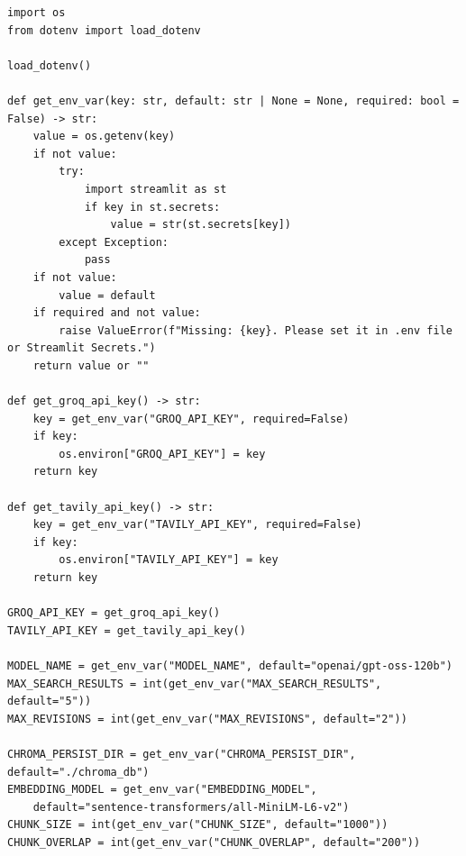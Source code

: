 \documentclass[11pt, a4paper]{article}
\begin{document}
\begin{lstlisting}[style=pythonstyle, caption={config/setting.py --- Poora Code}]
import os
from dotenv import load_dotenv

load_dotenv()

def get_env_var(key: str, default: str | None = None, required: bool = False) -> str:
    value = os.getenv(key)
    if not value:
        try:
            import streamlit as st
            if key in st.secrets:
                value = str(st.secrets[key])
        except Exception:
            pass
    if not value:
        value = default
    if required and not value:
        raise ValueError(f"Missing: {key}. Please set it in .env file or Streamlit Secrets.")
    return value or ""

def get_groq_api_key() -> str:
    key = get_env_var("GROQ_API_KEY", required=False)
    if key:
        os.environ["GROQ_API_KEY"] = key
    return key

def get_tavily_api_key() -> str:
    key = get_env_var("TAVILY_API_KEY", required=False)
    if key:
        os.environ["TAVILY_API_KEY"] = key
    return key

GROQ_API_KEY = get_groq_api_key()
TAVILY_API_KEY = get_tavily_api_key()

MODEL_NAME = get_env_var("MODEL_NAME", default="openai/gpt-oss-120b")
MAX_SEARCH_RESULTS = int(get_env_var("MAX_SEARCH_RESULTS", default="5"))
MAX_REVISIONS = int(get_env_var("MAX_REVISIONS", default="2"))

CHROMA_PERSIST_DIR = get_env_var("CHROMA_PERSIST_DIR", default="./chroma_db")
EMBEDDING_MODEL = get_env_var("EMBEDDING_MODEL",
    default="sentence-transformers/all-MiniLM-L6-v2")
CHUNK_SIZE = int(get_env_var("CHUNK_SIZE", default="1000"))
CHUNK_OVERLAP = int(get_env_var("CHUNK_OVERLAP", default="200"))
\end{lstlisting}
\end{document}
